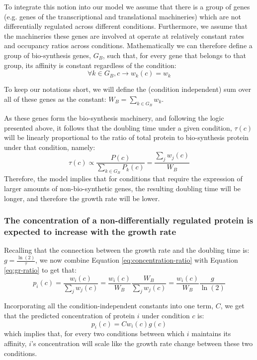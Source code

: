 \documentclass[notitlepage]{article}
\begin{document}
To integrate this notion into our model we assume that there is a group of genes (e.g. genes of the transcriptional and translational machineries) which are not differentially regulated across different conditions.
Furthermore, we assume that the machineries these genes are involved at operate at relatively constant rates and occupancy ratios across conditions.
Mathematically we can therefore define a group of bio-synthesis genes, $G_B$, such that, for every gene that belongs to that group, its affinity is constant regardless of the condition:
\begin{equation}
  \label{eq:biosynth-def}
  \forall k \in G_B, c \rightarrow w_k(c)=w_k
\end{equation}

To keep our notations short, we will define the (condition independent) sum over all of these genes as the constant: $W_B = \sum_{k\in G_B}w_k$.

As these genes form the bio-synthesis machinery, and following the logic presented above, it follows that the doubling time under a given condition, $\tau(c)$ will be linearly proportional to the ratio of total protein to bio-synthesis protein under that condition, namely:
\begin{equation}
  \label{eq:gr-ratio}
  \tau(c) \propto \frac{P(c)}{\sum_{k\in G_B}P_k(c)}=\frac{\sum_jw_j(c)}{W_B}
\end{equation}
Therefore, the model implies that for conditions that require the expression of larger amounts of non-bio-synthetic genes, the resulting doubling time will be longer, and therefore the growth rate will be lower.

\subsubsection{The concentration of a non-differentially regulated protein is expected to increase with the growth rate} 
Recalling that the connection between the growth rate and the doubling time is: $g=\frac{\ln(2)}{\tau}$, we now combine Equation \ref{eq:concentration-ratio} with Equation \ref{eq:gr-ratio} to get that:
\begin{equation}
  \label{eq:default-response}
  p_i(c)=\frac{w_i(c)}{\sum_jw_j(c)}=\frac{w_i(c)}{W_B}\frac{W_B}{\sum_jw_j(c)}=\frac{w_i(c)}{W_B}\frac{g}{\ln(2)}
\end{equation}

Incorporating all the condition-independent constants into one term, $C$, we get that the predicted concentration of protein $i$ under condition $c$ is:
\begin{equation}
  \label{eq:final-conc}
  p_i(c)=Cw_i(c)g(c)
\end{equation}
which implies that, for every two conditions between which $i$ maintains its affinity, $i$'s concentration will scale like the growth rate change between these two conditions.
\end{document}
